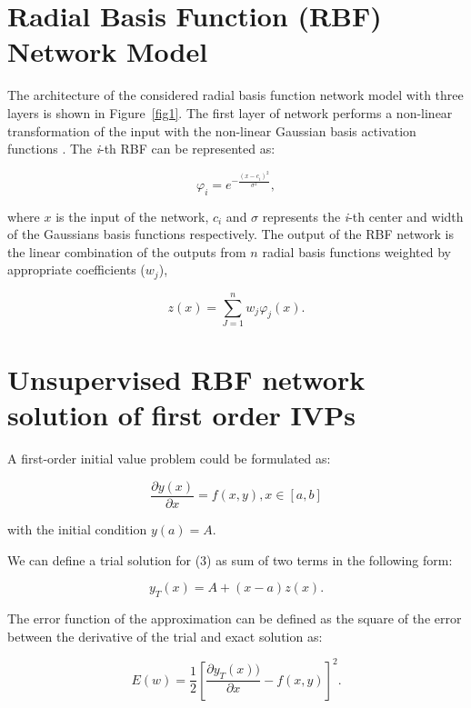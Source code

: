 \section{Radial Basis Function (RBF) Network Model}
\label{sec:2}

The architecture of the considered radial basis function network model with three layers is shown in Figure~\ref{fig1}. The first layer of network performs a non-linear transformation of the input with the non-linear Gaussian basis activation functions \cite{Chen6}. The {\it{i}}-th RBF can be represented as:

\begin{equation}
{\varphi_{i}=e^{-\frac{(x-c_{i})^{2}}{\sigma^{2}}}},
\end{equation}

\noindent
where $x$ is the input of the network, $c_i$ and $\sigma$ represents the {\it{i}}-th center and width of the Gaussians basis functions respectively. The output of the RBF network is the linear combination of the outputs from $n$ radial basis functions weighted by appropriate coefficients (${w_j}$),

\begin{equation}
{z(x)=\sum_{J=1}^{n}w_j\varphi_j(x)}.
\end{equation}


\section{Unsupervised RBF network solution of first order IVPs}
\label{sec:3}

A first-order initial value problem could be formulated as:

\begin{equation}
\frac{\partial y(x)}{\partial x}=f(x,y), x\in [a,b]
\end{equation}

\noindent
with the initial condition $y(a)=A$.

We can define a trial solution for (3) as sum of two terms in the following form:

\begin{equation}
y_T (x)=A+(x-a)z(x).
\end{equation}

The error function of the approximation can be defined as the square of the error between the derivative of the trial and exact solution as:

\begin{equation}
E(w)=\frac{1}{2}\left [ \frac{\partial y_T(x))}{\partial x}-f(x,y) \right ]^{2}.
\end{equation}

